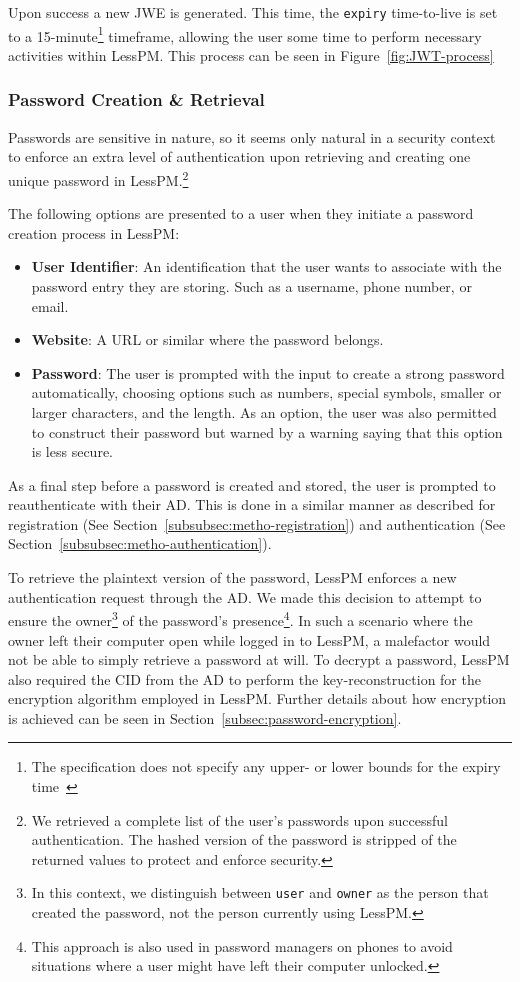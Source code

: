 Upon success a new JWE is generated.
This time, the \texttt{expiry} time-to-live is set to a 15-minute\footnote{
  The specification does not specify any upper- or lower bounds for the
  expiry time~\cite{RFC7519}
}
timeframe, allowing the user some time to perform necessary activities
within LessPM\@.
This process can be seen in Figure~\ref{fig:JWT-process}

\subsubsection{Password Creation \& Retrieval}\label{subsubsec:creation-and-retrieval}
Passwords are sensitive in nature, so it seems only natural in a security
context to enforce an extra level of authentication upon retrieving and creating
one unique password in LessPM.\footnote{
  We retrieved a complete list of the user's passwords upon successful authentication.
  The hashed version of the password is stripped of the returned values to protect and enforce security.
}

The following options are presented to a user when they initiate a password
creation process in LessPM:

\begin{itemize}
  \item \textbf{User Identifier}: An identification that the user wants to
  associate with the password entry they are storing.
  Such as a username, phone number, or email.
  \item \textbf{Website}: A URL or similar where the password belongs.
  \item \textbf{Password}: The user is prompted with the input to create a
  strong password automatically, choosing options such as numbers, special
  symbols, smaller or larger characters, and the length.
  As an option, the user was also permitted to construct their password but
  warned by a warning saying that this option is less secure.
\end{itemize}

As a final step before a password is created and stored, the user is prompted to
reauthenticate with their AD\@.
This is done in a similar manner as described for registration (See
Section~\ref{subsubsec:metho-registration}) and authentication (See
Section~\ref{subsubsec:metho-authentication}).

To retrieve the plaintext version of the password, LessPM enforces a new
authentication request through the AD\@.
We made this decision to attempt to ensure the owner\footnote{
  In this context, we distinguish between \texttt{user} and \texttt{owner}
  as the person that created the password, not the person currently using
  LessPM.
} of
the password's presence\footnote{
  This approach is also used in password managers on phones to avoid situations
  where a user might have left their computer unlocked.
}.
In such a scenario where the owner left their computer open while logged in to
LessPM, a malefactor would not be able to simply retrieve a password at will.
To decrypt a password, LessPM also required the CID from the AD to perform
the key-reconstruction for the encryption algorithm employed in LessPM\@.
Further details about how encryption is achieved can be seen in
Section~\ref{subsec:password-encryption}.